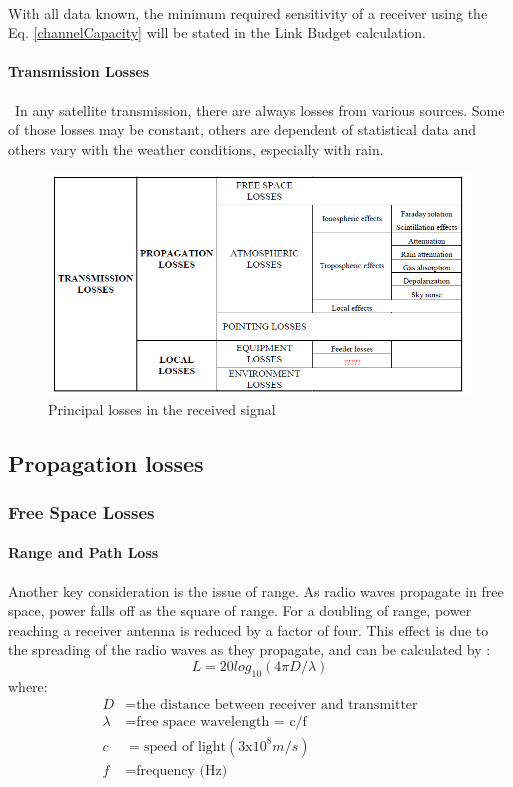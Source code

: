 \paragraph{} With all data known, the minimum required sensitivity of a receiver using the Eq. \ref{channelCapacity} will be stated in the Link Budget calculation.

\paragraph{Transmission Losses}
\ In any satellite transmission, there are always losses from various sources. Some of
those losses may be constant, others are dependent of statistical data and others vary
with the weather conditions, especially with rain.

\begin{figure}[h]
	\includegraphics[scale=0.8]{./sections/SatelliteDept/sections/images/principal_losses}
	\centering
	\caption{Principal losses in the received signal \cite{Jorge2012}}
	\label{principal_losses}
\end{figure}

\subsection{Propagation losses}
\subsubsection{Free Space Losses}
\paragraph{Range and Path Loss}
Another key consideration is the issue of range. As radio waves propagate in free space, power falls off as the square of range. For a doubling of range, power reaching a receiver antenna is reduced by a factor of four. This effect is due to the spreading of the radio waves as they propagate, and can be calculated by \cite{Note1998}:
\begin{equation}
L=20log_{10}(4\pi D/\lambda)
\label{FSP}
\end{equation}
where:
\begin{align*}
	D&= \text{the distance between receiver and transmitter}\\
	\lambda&= \text{free space wavelength = c/f}\\
	c&= \text{speed of light}(3\mathrm{x}10^8m/s)\\
	f&= \text{frequency (Hz)}
\end{align*}
\clearpage
